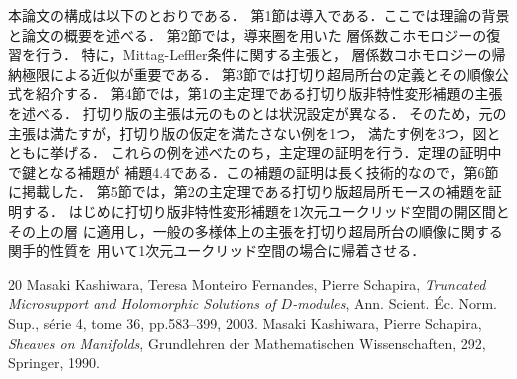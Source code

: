 ﻿\documentclass[a4paper]{jsarticle}
\theoremstyle{definition}
\numberwithin{equation}{section}
\theoremstyle{mystyle}
\begin{document}
本論文の構成は以下のとおりである．
第1節は導入である．ここでは理論の背景と論文の概要を述べる．
第2節では，導来圏を用いた
層係数こホモロジーの復習を行う．
特に，Mittag-Leffler条件に関する主張と，
層係数コホモロジーの帰納極限による近似が重要である．
第3節では打切り超局所台の定義とその順像公式を紹介する．
第4節では，第1の主定理である打切り版非特性変形補題の主張を述べる．
打切り版の主張は元のものとは状況設定が異なる．
そのため，元の主張は満たすが，打切り版の仮定を満たさない例を1つ，
満たす例を3つ，図とともに挙げる．
これらの例を述べたのち，主定理の証明を行う．定理の証明中で鍵となる補題が
補題4.4である．この補題の証明は長く技術的なので，第6節に掲載した．
第5節では，第2の主定理である打切り版超局所モースの補題を証明する．
はじめに打切り版非特性変形補題を1次元ユークリッド空間の開区間とその上の層
に適用し，一般の多様体上の主張を打切り超局所台の順像に関する関手的性質を
用いて1次元ユークリッド空間の場合に帰着させる．
\begin{thebibliography}{20} 
   Masaki Kashiwara, Teresa Monteiro Fernandes, Pierre Schapira, 
    \textit{Truncated Microsupport and Holomorphic Solutions 
    of \(D\)-modules}, 
    Ann. Scient. \'Ec. Norm. Sup., s\'erie 4, tome 36, 
    pp.583--399, 2003.
   Masaki Kashiwara, Pierre Schapira, 
    \textit{Sheaves on Manifolds}, 
    Grundlehren der Mathematischen Wissenschaften, 292, Springer, 1990.
\end{thebibliography}
\end{document}
